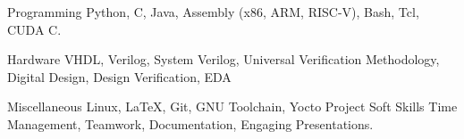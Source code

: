 

\begin{cvskills}

  \cvskill
    {Programming} %
    {Python, C, Java, Assembly (x86, ARM, RISC-V), Bash, Tcl, CUDA C.} %
    
  \cvskill
    {Hardware} %
    {VHDL, Verilog, System Verilog, Universal Verification Methodology, Digital Design, Design Verification, EDA} %

  \cvskill
    {Miscellaneous} %
    {Linux, \LaTeX, Git, GNU Toolchain, Yocto Project} %
  \cvskill
    {Soft Skills} %
    {Time Management, Teamwork, Documentation, Engaging Presentations.} %

\end{cvskills}
